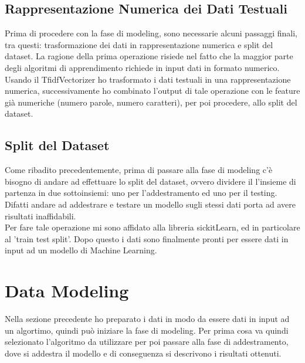 \documentclass[]{article}
\begin{document}
        \subsection{Rappresentazione Numerica dei Dati Testuali}
            Prima di procedere con la fase di modeling, sono necessarie alcuni passaggi finali, tra questi: trasformazione dei dati in rappresentazione numerica e split del dataset. La ragione della prima operazione risiede nel fatto che la maggior parte degli algoritmi di apprendimento richiede in input dati in formato numerico.\\
            Usando il TfidfVectorizer ho trasformato i dati testuali in una rappresentazione numerica, successivamente ho combinato l'output di tale operazione con le feature già numeriche (numero parole, numero caratteri), per poi procedere, allo split del dataset.

        \subsection{Split del Dataset}
            Come ribadito precedentemente, prima di passare alla fase di modeling c'è bisogno di andare ad effettuare lo split del dataset, ovvero dividere il l'insieme di partenza in due sottoinsiemi: uno per l'addestramento ed uno per il testing. Difatti andare ad addestrare e testare un modello sugli stessi dati porta ad avere risultati inaﬃdabili.\\
            Per fare tale operazione mi sono affidato alla libreria sickitLearn, ed in particolare al 'train test split'.
            Dopo questo i dati sono finalmente pronti per essere dati in input ad un modello di Machine Learning.

        \newpage
        \section{Data Modeling}
            Nella sezione precedente ho preparato i dati in modo da essere dati in input ad un algortimo, quindi può iniziare la fase di modeling. Per prima cosa va quindi selezionato l’algoritmo da
            utilizzare per poi passare alla fase di addestramento, dove si addestra il modello e di conseguenza si descrivono i risultati ottenuti.
\end{document}
